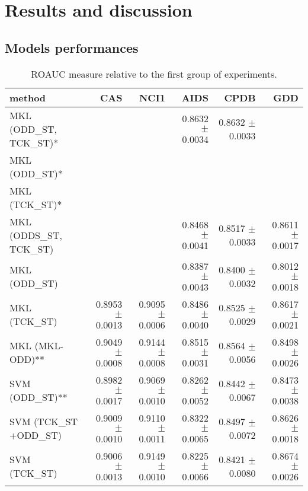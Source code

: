 
\section{Results and discussion}
\label{subsec:results}

\subsection{Models performances}

\begin{landscape}
    \begin{table}[ht]
        \centering
        \begin{tabular}{|l|r|r|r|r|r|}
            \hline
            method&CAS&NCI1&AIDS&CPDB&GDD\\
            \hline
            MKL (ODD\_ST, TCK\_ST)* &&&0.8632 $\pm$ 0.0034&0.8632 $\pm$ 0.0033&\\
            \hline
            MKL (ODD\_ST)*&&&&&\\
            \hline
            MKL (TCK\_ST)*&&&&&\\
            \hline
            MKL (ODDS\_ST, TCK\_ST)&&&0.8468 $\pm$ 0.0041&0.8517 $\pm$ 0.0033&0.8611 $\pm$ 0.0017\\
            \hline
            MKL (ODD\_ST)&&&0.8387 $\pm$ 0.0043&0.8400 $\pm$ 0.0032&0.8012$\pm$ 0.0018\\
            \hline
            MKL (TCK\_ST)&0.8953 $\pm$ 0.0013&0.9095 $\pm$ 0.0006&0.8486 $\pm$ 0.0040&0.8525 $\pm$ 0.0029&0.8617 $\pm$ 0.0021\\
            \hline
            MKL (MKL-ODD)** &0.9049 $\pm$ 0.0008&0.9144 $\pm$ 0.0008&0.8515 $\pm$ 0.0031&0.8564 $\pm$ 0.0056&0.8498 $\pm$ 0.0026\\
            \hline
            SVM (ODD\_ST)** &0.8982 $\pm$ 0.0017&0.9069 $\pm$ 0.0010&0.8262 $\pm$ 0.0052&0.8442 $\pm$ 0.0067&0.8473 $\pm$ 0.0038\\
            \hline
            SVM (TCK\_ST +ODD\_ST)&0.9009 $\pm$ 0.0010&0.9110 $\pm$ 0.0011&0.8322 $\pm$ 0.0065&0.8497 $\pm$ 0.0072&0.8626 $\pm$ 0.0018\\
            \hline
            SVM (TCK\_ST)&0.9006 $\pm$ 0.0013&0.9149 $\pm$ 0.0010&0.8225 $\pm$ 0.0066&0.8421 $\pm$ 0.0080&0.8674 $\pm$ 0.0026\\
            \hline
        \end{tabular}
        \label{table:results_st}
        \caption{ROAUC measure relative to the first group of experiments.}


\end{table}
\end{landscape}
